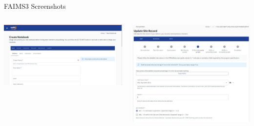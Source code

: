 \begin{frame}{FAIMS3 Screenshots}

\vfill
\begin{columns}[T]

\begin{column}{0.55\textwidth}
\centering
\includegraphics[width=\textwidth]{Images/Screenshot_20211209_123600_Selection_001.png}
\end{column}
\begin{column}{0.35\textwidth}
\centering
\includegraphics[width=\textwidth]{Images/Screenshot 2022-03-04 182606.jpg} 
\end{column}

\end{columns}
\end{frame}

